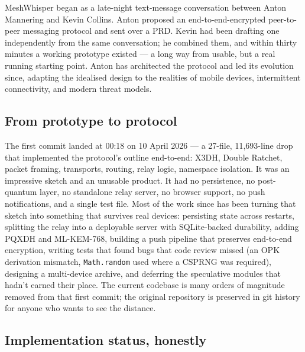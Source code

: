 \documentclass[11pt, a4paper]{article}
\begin{document}
MeshWhisper began as a late-night text-message conversation between Anton Mannering and Kevin Collins. Anton proposed an end-to-end-encrypted peer-to-peer messaging protocol and sent over a PRD. Kevin had been drafting one independently from the same conversation; he combined them, and within thirty minutes a working prototype existed --- a long way from usable, but a real running starting point. Anton has architected the protocol and led its evolution since, adapting the idealised design to the realities of mobile devices, intermittent connectivity, and modern threat models.

\subsection*{From prototype to protocol}

The first commit landed at 00:18 on 10 April 2026 --- a 27-file, 11{,}693-line drop that implemented the protocol's outline end-to-end: X3DH, Double Ratchet, packet framing, transports, routing, relay logic, namespace isolation. It was an impressive sketch and an unusable product. It had no persistence, no post-quantum layer, no standalone relay server, no browser support, no push notifications, and a single test file. Most of the work since has been turning that sketch into something that survives real devices: persisting state across restarts, splitting the relay into a deployable server with SQLite-backed durability, adding PQXDH and ML-KEM-768, building a push pipeline that preserves end-to-end encryption, writing tests that found bugs that code review missed (an OPK derivation mismatch, \texttt{Math.random} used where a CSPRNG was required), designing a multi-device archive, and deferring the speculative modules that hadn't earned their place. The current codebase is many orders of magnitude removed from that first commit; the original repository is preserved in git history for anyone who wants to see the distance.

\subsection*{Implementation status, honestly}
\end{document}
